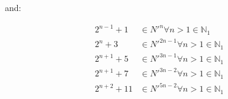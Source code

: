 \documentclass{article}
\begin{document}
\noindent
and:

\begin{displaymath}\begin{aligned}
2^{n-1}+1  & \in N'^n      \forall n>1 \in \mathbb{N}_{1} \\
2^n+3      & \in N'^{2n-1} \forall n>1 \in \mathbb{N}_{1} \\
2^{n+1}+5  & \in N'^{3n-1} \forall n>1 \in \mathbb{N}_{1} \\
2^{n+1}+7  & \in N'^{3n-2} \forall n>1 \in \mathbb{N}_{1} \\
2^{n+2}+11 & \in N'^{5n-2} \forall n>1 \in \mathbb{N}_{1}
\end{aligned}\end{displaymath}
\end{document}
